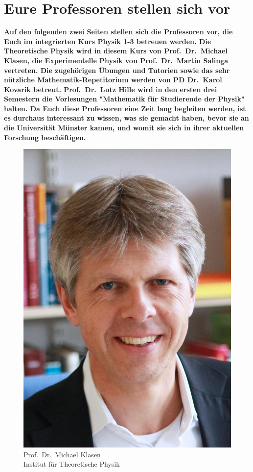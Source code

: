 \section[Eure Profs stellen sich vor]{Eure Professoren stellen sich vor}
\textbf{Auf den folgenden zwei Seiten stellen sich die Professoren vor, die Euch im integrierten Kurs Physik 1-3 betreuen werden. 
Die Theoretische Physik wird in diesem Kurs von Prof.\ Dr.\ Michael Klasen, die Experimentelle Physik von Prof.\ Dr.\ Martin Salinga vertreten. 
Die zugehörigen Übungen und Tutorien sowie das sehr nützliche Mathematik-Repetitorium werden von PD Dr.\ Karol Kovarik betreut. 
Prof.\ Dr.\ Lutz Hille wird in den ersten drei Semestern die Vorlesungen "Mathematik für Studierende der Physik" halten. Da Euch diese Professoren eine Zeit lang begleiten werden, ist es durchaus interessant zu wissen, was sie gemacht haben, bevor sie an die Universität Münster kamen, und womit sie sich in ihrer aktuellen Forschung beschäftigen.}

 \begin{figure}
	\centering
\includegraphics[width=0.8\columnwidth, height=0.25\textheight]{res/vorstellungsfotos/klasen_2016_5.jpg}
	\caption*{\centering Prof.\ Dr.\ Michael Klasen \\ Institut für Theoretische Physik}
\end{figure}

